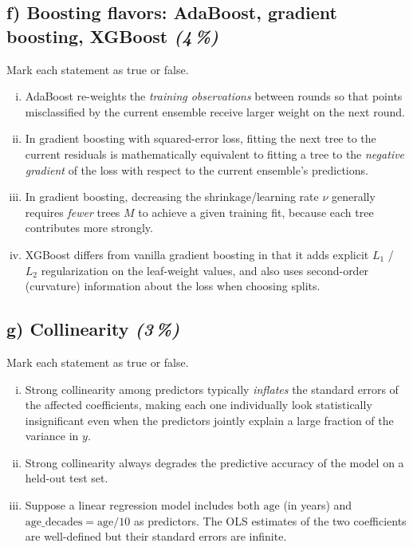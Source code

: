 \documentclass[11pt,a4paper]{article}
\newcommand{\subpoints}[1]{\textit{(#1\,\%)}}
\begin{document}
\subsection*{f) Boosting flavors: AdaBoost, gradient boosting, XGBoost \subpoints{4}}
Mark each statement as true or false.
\begin{enumerate}[(i)]
  \item AdaBoost re-weights the \emph{training observations} between rounds so that points misclassified by the current ensemble receive larger weight on the next round.
  \item In gradient boosting with squared-error loss, fitting the next tree to the current residuals is mathematically equivalent to fitting a tree to the \emph{negative gradient} of the loss with respect to the current ensemble's predictions.
  \item In gradient boosting, decreasing the shrinkage/learning rate $\nu$ generally requires \emph{fewer} trees $M$ to achieve a given training fit, because each tree contributes more strongly.
  \item XGBoost differs from vanilla gradient boosting in that it adds explicit $L_1$ / $L_2$ regularization on the leaf-weight values, and also uses second-order (curvature) information about the loss when choosing splits.
\end{enumerate}

\subsection*{g) Collinearity \subpoints{3}}
Mark each statement as true or false.
\begin{enumerate}[(i)]
  \item Strong collinearity among predictors typically \emph{inflates} the standard errors of the affected coefficients, making each one individually look statistically insignificant even when the predictors jointly explain a large fraction of the variance in $y$.
  \item Strong collinearity always degrades the predictive accuracy of the model on a held-out test set.
  \item Suppose a linear regression model includes both $\text{age}$ (in years) and $\text{age\_decades} = \text{age}/10$ as predictors. The OLS estimates of the two coefficients are well-defined but their standard errors are infinite.
\end{enumerate}
\end{document}
